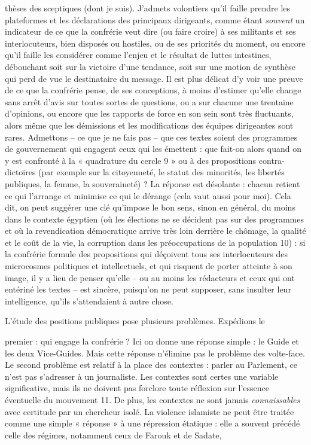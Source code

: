 thèses des sceptiques (dont je suis). J'admets volontiers qu'il faille
prendre les plateformes et les déclarations des principaux dirigeants,
comme étant \emph{souvent} un indicateur de ce que la confrérie veut
dire (ou faire croire) à ses militants et ses interlocuteurs, bien
disposés ou hostiles, ou de ses priorités du moment, ou encore qu'il
faille les considérer comme l'enjeu et le résultat de luttes intestines,
débouchant soit sur la victoire d'une tendance, soit sur une motion de
synthèse qui perd de vue le destinataire du message. Il est plus délicat
d'y voir une preuve de ce que la confrérie pense, de ses conceptions, à
moins d'estimer qu'elle change sans arrêt d'avis sur toutes sortes de
questions, ou a sur chacune une trentaine d'opinions, ou encore que les
rapports de force en son sein sont très fluctuants, alors même que les
démissions et les modifications des équipes dirigeantes sont rares.
Admettons -- ce que je ne fais pas -- que ces textes soient des
programmes de gouvernement qui engagent ceux qui les émettent : que
fait-on alors quand on y est confronté à la « quadrature du cercle 9 »
ou à des propositions contra- dictoires (par exemple sur la citoyenneté,
le statut des minorités, les libertés publiques, la femme, la
souveraineté) ? La réponse est désolante : chacun retient ce qui
l'arrange et minimise ce qui le dérange (cela vaut aussi pour moi). Cela
dit, on peut suggérer une clé qu'impose le bon sens, sinon en général,
du moins dans le contexte égyptien (où les élections ne se décident pas
sur des programmes et où la revendication démocratique arrive très loin
derrière le chômage, la qualité et le coût de la vie, la corruption dans
les préoccupations de la population 10) : si la confrérie formule des
propositions qui déçoivent tous ses interlocuteurs des microcosmes
politiques et intellectuels, et qui risquent de porter atteinte à son
image, il y a lieu de penser qu'elle -- ou au moins les rédacteurs et
ceux qui ont entériné les textes -- est sincère, puisqu'on ne peut
supposer, sans insulter leur intelligence, qu'ils s'attendaient à autre
chose.

L'étude des positions publiques pose plusieurs problèmes. Expédions le

premier : qui engage la confrérie ? Ici on donne une réponse simple : le
Guide et les deux Vice-Guides. Mais cette réponse n'élimine pas le
problème des volte-face. Le second problème est relatif à la place des
contextes : parler au Parlement, ce n'est pas s'adresser à un
journaliste. Les contextes sont certes une variable significative, mais
ils ne doivent pas forclore toute réflexion sur l'essence éventuelle du
mouvement 11. De plus, les contextes ne sont jamais \emph{connaissables}
avec certitude par un chercheur isolé. La violence islamiste ne peut
être traitée comme une simple « réponse » à une répression étatique :
elle a souvent précédé celle des régimes, notamment ceux de Farouk et de
Sadate,

